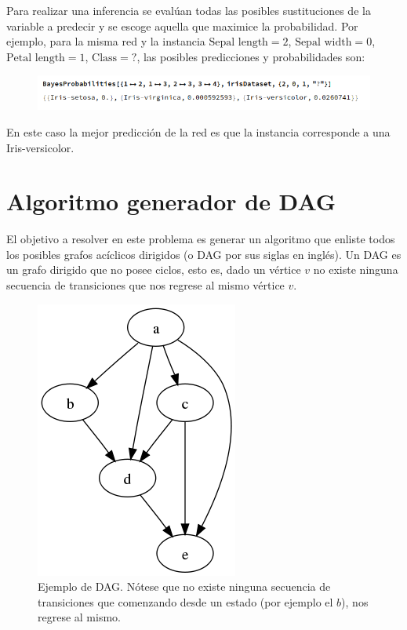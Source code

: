 \documentclass[10pt,a4paper]{article}
\begin{document}
Para realizar una inferencia se evalúan todas las posibles sustituciones de la variable a predecir y se escoge aquella que maximice la probabilidad. Por ejemplo, para la misma red y la instancia $\text{Sepal length} = 2$, $\text{Sepal width} = 0$, $\text{Petal length} = 1$, $\text{Class} = ?$, las posibles predicciones y probabilidades son:

\begin{figure}[h!tb!]
\centering
    \includegraphics[scale=0.45]{img/iris_query.png}
\end{figure}

En este caso la mejor predicción de la red es que la instancia corresponde a una Iris-versicolor.

\section{Algoritmo generador de DAG} \label{sec:dag}
El objetivo a resolver en este problema es generar un algoritmo que enliste todos los posibles grafos acíclicos dirigidos (o DAG por sus siglas en inglés). Un DAG es un grafo dirigido que no posee ciclos, esto es, dado un vértice $v$ no existe ninguna secuencia de transiciones que nos regrese al mismo vértice $v$.

\begin{figure}[h!]
\centering
\includegraphics[scale=0.4]{img/DAG}
\caption{Ejemplo de DAG. Nótese que no existe ninguna secuencia de transiciones que comenzando desde un estado (por ejemplo el $b$), nos regrese al mismo.}
\end{figure}
\end{document}
